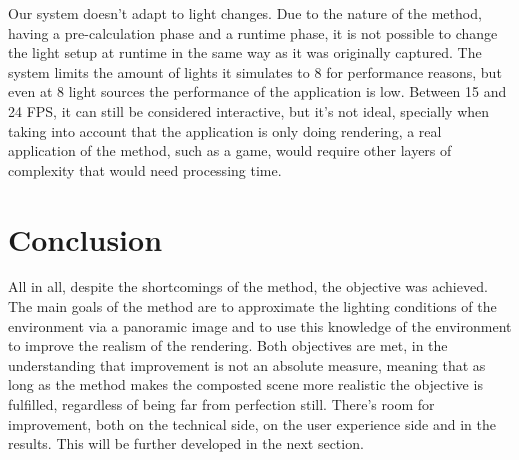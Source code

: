 Our system doesn't adapt to light changes. Due to the nature of the method, having a pre-calculation phase and a runtime phase, it is not possible to change the light setup at runtime in the same way as it was originally captured.\newline
The system limits the amount of lights it simulates to 8 for performance reasons, but even at 8 light sources the performance of the application is low. Between 15 and 24 FPS, it can still be considered interactive, but it's not ideal, specially when taking into account that the application is only doing rendering, a real application of the method, such as a game, would require other layers of complexity that would need processing time.\newline


\section{Conclusion}
All in all, despite the shortcomings of the method, the objective was achieved. The main goals of the method are to approximate the lighting conditions of the environment via a panoramic image and to use this knowledge of the environment to improve the realism of the rendering. Both objectives are met, in the understanding that improvement is not an absolute measure, meaning that as long as the method makes the composted scene more realistic the objective is fulfilled, regardless of being far from perfection still.\newline
There's room for improvement, both on the technical side, on the user experience side and in the results. This will be further developed in the next section.


